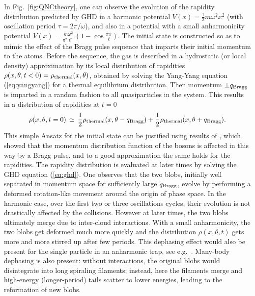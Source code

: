 \documentclass[onecolumn,amsfonts,showpacs,superscriptaddress]{revtex4-1}
\begin{document}
In Fig.~\ref{fig:QNCtheory}, one can observe the evolution of the rapidity distribution predicted by GHD in a harmonic potential $V(x) = \frac{1}{2}m \omega^2 x^2$ (with oscillation period $\tau = 2\pi/\omega$), and also in a potential with a small anharmonicity potential $V(x) = \frac{m \omega^2}{\pi^2 \ell^2} (1 - \cos \frac{\pi x}{\ell} )$. The initial state is constructed so as to mimic the effect of the Bragg pulse sequence that imparts their initial momentum to the atoms. Before the sequence, the gas is described in a hydrostatic (or local density) approximation by its local distribution of rapidities $\rho(x,\theta,t<0) = \rho_{\rm thermal}(x,\theta)$, obtained by solving the Yang-Yang equation (\ref{eq:yangyang}) for a thermal equilibrium distribution. Then momentum $\pm q_{\rm Bragg}$ is imparted in a random fashion to all quasiparticles in the system. This results in a distribution of rapidities at $t=0$
\begin{equation}
    \label{eq:initial_Bragg}
    \rho( {x,\theta,t=0}) \, \simeq \,  \frac{1}{2} \rho_{\rm thermal}(x,\theta - q_{\rm Bragg})  + \frac{1}{2} \rho_{\rm thermal}(x,\theta + q_{\rm Bragg}) .
\end{equation}
This simple Ansatz for the initial state can be justified using results of \citep{van2016separation}, which showed that the momentum distribution function of the bosons is affected in this way by a Bragg pulse, and to a good approximation the same holds for the rapidities. The rapidity distribution is evaluated at later times by solving the GHD equation (\ref{eq:ghd}). One observes that the two blobs, initially well separated in momentum space for sufficiently large $q_{\rm Bragg}$, evolve by performing a deformed rotation-like movement around the origin of phase space. In the harmonic case, over the first two or three oscillations cycles, their evolution is not drastically affected by the collisions. However at later times, the two blobs ultimately merge due to inter-cloud interactions. With a small anharmonicity, the two blobs get deformed much more quickly and the distribution $\rho(x,\theta,t)$ gets more and more stirred up after few periods. This dephasing effect would also be present for the single particle in an anharmonic trap, see e.g.~\citep{bastianello2017quenches}. Many-body dephasing is also present: without interactions, the original blobs would disintegrate into long spiraling filaments; instead, here the filaments merge and high-energy (longer-period) tails scatter to lower energies, leading to the reformation of new blobs.
\end{document}
